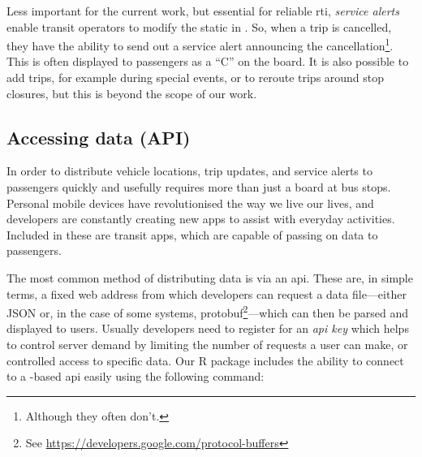 Less important for the current work, but essential for reliable \gls{rti}, \emph{service alerts} enable transit operators to modify the static \GTFS{} in \rt{}. So, when a trip is cancelled, they have the ability to send out a service alert announcing the cancellation\footnote{Although they often don't.}. This is often displayed to passengers as a ``C'' on the \rt{} board. It is also possible to add trips, for example during special events, or to reroute trips around stop closures, but this is beyond the scope of our work.



\subsection{Accessing \rt{} data (API)}
\label{sec:gtfs_rt_api}

In order to distribute vehicle locations, trip updates, and service alerts to passengers quickly and usefully requires more than just a \rt{} board at bus stops. Personal mobile devices have revolutionised the way we live our lives, and developers are constantly creating new apps to assist with everyday activities. Included in these are transit apps, which are capable of passing on \rt{} \GTFS{} data to passengers.

The most common method of distributing \rt{} data is via an \gls{api}. These are, in simple terms, a fixed web address from which developers can request a data file---either JSON or, in the case of some \GTFS{} systems, protobuf\footnote{See \url{https://developers.google.com/protocol-buffers}}---which can then be parsed and displayed to users. Usually developers need to register for an \emph{\gls{api} key} which helps to control server demand by limiting the number of requests a user can make, or controlled access to specific data. Our R package includes the ability to connect to a \GTFS{}-based \gls{api} easily using the following command:
\begin{knitrout}\small
{}\color{fgcolor}
\end{knitrout}
